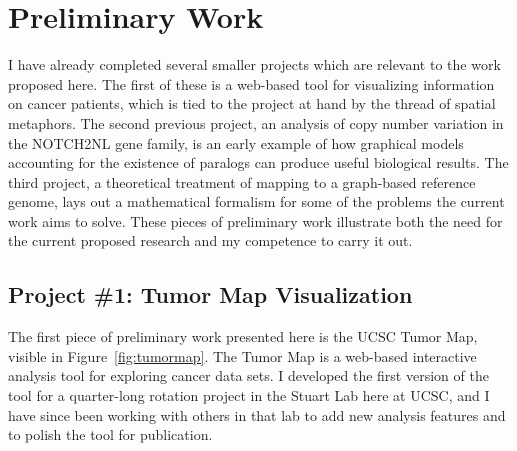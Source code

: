 \documentclass[11pt,proposal]{ucthesis}
\begin{document}

\chapter{Preliminary Work}

I have already completed several smaller projects which are relevant to the work proposed here. The first of these is a web-based tool for visualizing information on cancer patients, which is tied to the project at hand by the thread of spatial metaphors. The second previous project, an analysis of copy number variation in the NOTCH2NL gene family, is an early example of how graphical models accounting for the existence of paralogs can produce useful biological results. The third project, a theoretical treatment of mapping to a graph-based reference genome, lays out a mathematical formalism for some of the problems the current work aims to solve. These pieces of preliminary work illustrate both the need for the current proposed research and my competence to carry it out.


\section{Project \#1: Tumor Map Visualization}

The first piece of preliminary work presented here is the UCSC Tumor Map, visible in Figure~\ref{fig:tumormap}. The Tumor Map is a web-based interactive analysis tool for exploring cancer data sets. I developed the first version of the tool for a quarter-long rotation project in the Stuart Lab here at UCSC, and I have since been working with others in that lab to add new analysis features and to polish the tool for publication.
\end{document}
